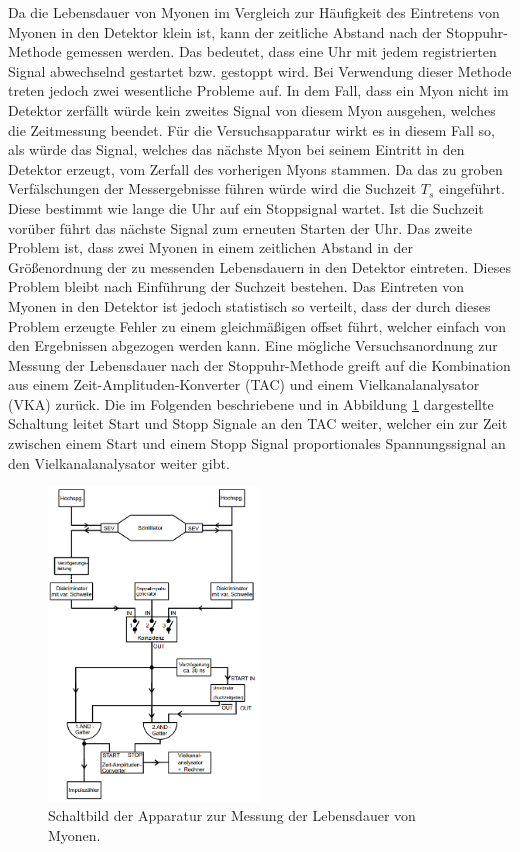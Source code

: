 Da die Lebensdauer von Myonen im Vergleich zur Häufigkeit des Eintretens von Myonen in den Detektor klein ist, kann der zeitliche Abstand nach der Stoppuhr-Methode gemessen werden.
Das bedeutet, dass eine Uhr mit jedem registrierten Signal abwechselnd gestartet bzw. gestoppt wird.
Bei Verwendung dieser Methode treten jedoch zwei wesentliche Probleme auf.
In dem Fall, dass ein Myon nicht im Detektor zerfällt würde kein zweites Signal von diesem Myon ausgehen, welches die Zeitmessung beendet.
Für die Versuchsapparatur wirkt es in diesem Fall so, als würde das Signal, welches das nächste Myon bei seinem Eintritt in den Detektor erzeugt, vom Zerfall des vorherigen Myons stammen.
Da das zu groben Verfälschungen der Messergebnisse führen würde wird die Suchzeit $T_s$ eingeführt.
Diese bestimmt wie lange die Uhr auf ein Stoppsignal wartet.
Ist die Suchzeit vorüber führt das nächste Signal zum erneuten Starten der Uhr.
Das zweite Problem ist, dass zwei Myonen in einem zeitlichen Abstand in der Größenordnung der zu messenden Lebensdauern in den Detektor eintreten.
Dieses Problem bleibt nach Einführung der Suchzeit bestehen.
Das Eintreten von Myonen in den Detektor ist jedoch statistisch so verteilt, dass der durch dieses Problem erzeugte Fehler zu einem gleichmäßigen offset führt, welcher einfach von den Ergebnissen abgezogen werden kann.
Eine mögliche Versuchsanordnung zur Messung der Lebensdauer nach der Stoppuhr-Methode greift auf die Kombination aus einem Zeit-Amplituden-Konverter (TAC) und einem Vielkanalanalysator (VKA) zurück.
Die im Folgenden beschriebene und in Abbildung \ref{fig:t:1} dargestellte Schaltung leitet Start und Stopp Signale an den TAC weiter, welcher ein zur Zeit zwischen einem Start und einem Stopp Signal proportionales Spannungssignal an den Vielkanalanalysator weiter gibt.
\begin{figure}
\centering
\includegraphics[width=0.5\textwidth]{content/skizzen/aufbau.png}
\caption{Schaltbild der Apparatur zur Messung der Lebensdauer von Myonen.}
\label{fig:t:1}
\end{figure}
